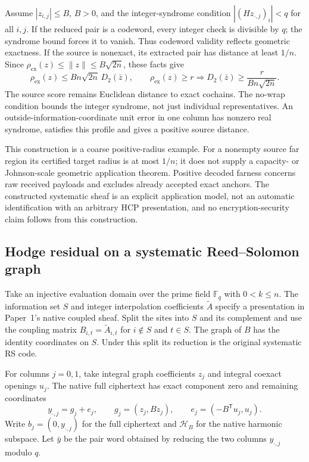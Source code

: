Assume \(|z_{i,j}|\le B\), \(B>0\), and the integer-syndrome condition
\(|(Hz_{\cdot,j})_i|<q\) for all \(i,j\). If the reduced pair is a codeword,
every integer check is divisible by \(q\); the syndrome bound forces it to
vanish. Thus codeword validity reflects geometric exactness. If the source is
nonexact, its extracted pair has distance at least \(1/n\). Since
\(\rho_{\mathrm{ex}}(z)\le\|z\|\le B\sqrt{2n}\), these facts give
\[
 \rho_{\mathrm{ex}}(z)\le Bn\sqrt{2n}\,D_2(\bar z),
 \qquad
 \rho_{\mathrm{ex}}(z)\ge r
 \Longrightarrow D_2(\bar z)\ge\frac{r}{Bn\sqrt{2n}}.
\]
The source score remains Euclidean distance to exact cochains. The no-wrap
condition bounds the integer syndrome, not just individual representatives.
An outside-information-coordinate unit error in one column has nonzero real
syndrome, satisfies this profile and gives a positive source distance.

This construction is a coarse positive-radius example. For a nonempty source
far region its certified target radius is at most \(1/n\); it does not supply
a capacity- or Johnson-scale geometric application theorem. Positive decoded
farness concerns raw received payloads and excludes already accepted exact
anchors. The constructed systematic sheaf is an explicit application model,
not an automatic identification with an arbitrary HCP presentation, and no
encryption-security claim follows from this construction.

\subsection{Hodge residual on a systematic Reed--Solomon graph}
\label{sec:restricted-hodge-rs}

Take an injective evaluation domain over the prime field \(\mathbb F_q\)
with \(0<k\le n\). The information set \(S\) and integer interpolation
coefficients \(\widetilde A\) specify a presentation in Paper~1's native
coupled sheaf. Split the sites into \(S\) and its complement and use the
coupling matrix \(B_{i,t}=\widetilde A_{i,t}\) for \(i\notin S\) and
\(t\in S\). The graph of \(B\) has the identity coordinates on \(S\).
Under this split its reduction is the original systematic RS code.

For columns \(j=0,1\), take integral graph coefficients \(z_j\) and
integral coexact openings \(u_j\). The native full ciphertext has exact
component zero and remaining coordinates
\[
  y_{\cdot,j}=g_j+e_j,\qquad
  g_j=(z_j,Bz_j),\qquad e_j=(-B^{\mathsf T}u_j,u_j).
\]
Write \(b_j=(0,y_{\cdot,j})\) for the full ciphertext and
\(\mathcal H_B\) for the native harmonic subspace. Let \(\bar y\) be the
pair word obtained by reducing the two columns \(y_{\cdot,j}\) modulo \(q\).

